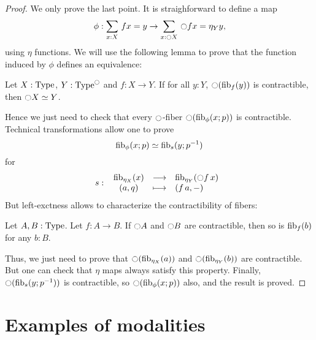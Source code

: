 \begin{proof}
  We only prove the last point.
  It is straighforward to define a map
  \[ \phi:\sum_{x:X}\, f x = y\to
    \sum_{x:\ocircle X}\, \ocircle f x = \eta_Y y,\]
  using $\eta$ functions.
  We will use the following lemma to prove that the function induced
  by $\phi$ defines an equivalence:
  \begin{lem}
    Let $X:\operatorname{Type}$, $Y:\operatorname{Type}^{\ocircle}$ and $f:X\to Y$. If for all $y:Y$,
    $\ocircle (\mathrm{fib}_{f}(y))$ is contractible, then $\ocircle X \simeq Y$.
  \end{lem}
  Hence we just need to check that every $\ocircle$-fiber $\ocircle(\mathrm{fib}_{\phi}(x;p))$ is contractible.
  Technical transformations allow one to prove
  \[ \mathrm{fib}_{\phi}(x;p) \simeq \mathrm{fib}_{s}(y;p^{-1})\]
  for
  \[
    s \, \colon \left. \begin{array}{ccl} \mathrm{fib}_{\eta_X}(x) & \longrightarrow & \mathrm{fib}_{\eta_Y}(\ocircle f\, x) \\ (a,q) & \longmapsto & (f\, a,-) \end{array} \right.
  \]
  But left-exctness allows to characterize the contractibility of fibers:
  \begin{lem}
    Let $A,B:\operatorname{Type}$. Let $f:A\to B$. If $\ocircle A$ and $\ocircle B$ are
    contractible, then so is $\mathrm{fib}_{f}(b)$ for any $b:B$.
  \end{lem}
  Thus, we just need to prove that $\ocircle(\mathrm{fib}_{\eta_X}(a))$ and
  $\ocircle(\mathrm{fib}_{\eta_Y}(b))$ are contractible. But one can check that
  $\eta$ maps always satisfy this property.
  Finally, $\ocircle(\mathrm{fib}_{s}(y;p^{-1}))$ is contractible, so $\ocircle(\mathrm{fib}_{\phi}(x;p))$ also, and the result is proved.

\end{proof}



\section{Examples of modalities}
\label{sec:modalities-examples}

